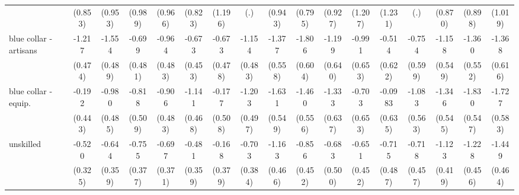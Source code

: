 {\begin{tabular}{l*{16}{c}}
                    &     (0.853)         &     (0.953)         &     (0.989)         &     (0.966)         &     (0.823)         &     (1.196)         &         (.)         &     (0.943)         &     (0.795)         &     (0.927)         &     (1.207)         &     (1.231)         &         (.)         &     (0.870)         &     (0.898)         &     (1.019)         \\
[1em]
blue collar - artisans&      -1.217\sym{*}  &      -1.554\sym{**} &      -0.699         &      -0.964\sym{*}  &      -0.673         &      -0.673         &      -1.154\sym{*}  &      -1.377\sym{*}  &      -1.806\sym{**} &      -1.199         &      -0.991         &      -0.514         &      -0.754         &      -1.158\sym{*}  &      -1.360\sym{*}  &      -1.368\sym{*}  \\
                    &     (0.474)         &     (0.489)         &     (0.481)         &     (0.483)         &     (0.453)         &     (0.478)         &     (0.483)         &     (0.558)         &     (0.604)         &     (0.640)         &     (0.653)         &     (0.622)         &     (0.599)         &     (0.549)         &     (0.552)         &     (0.616)         \\
[1em]
blue collar - equip.&      -0.192         &      -0.980\sym{*}  &      -0.818         &      -0.906         &      -1.141\sym{*}  &      -0.177         &      -1.203\sym{*}  &      -1.631\sym{**} &      -1.460\sym{**} &      -1.333\sym{*}  &      -0.703         &     -0.0983         &      -1.083         &      -1.346\sym{*}  &      -1.830\sym{***}&      -1.727\sym{**} \\
                    &     (0.443)         &     (0.485)         &     (0.509)         &     (0.483)         &     (0.468)         &     (0.508)         &     (0.497)         &     (0.549)         &     (0.556)         &     (0.637)         &     (0.653)         &     (0.635)         &     (0.563)         &     (0.545)         &     (0.547)         &     (0.583)         \\
[1em]
unskilled           &      -0.520         &      -0.644         &      -0.755\sym{*}  &      -0.697         &      -0.481         &      -0.168         &      -0.703         &      -1.163\sym{*}  &      -0.856         &      -0.683         &      -0.651         &      -0.715         &      -0.718         &      -1.123\sym{**} &      -1.228\sym{**} &      -1.449\sym{**} \\
                    &     (0.325)         &     (0.359)         &     (0.377)         &     (0.371)         &     (0.359)         &     (0.379)         &     (0.384)         &     (0.466)         &     (0.452)         &     (0.500)         &     (0.452)         &     (0.487)         &     (0.457)         &     (0.419)         &     (0.456)         &     (0.464)         \\

\end{tabular}}
